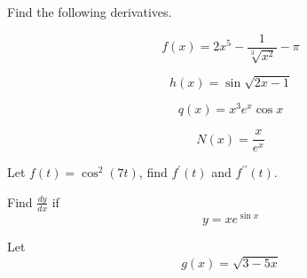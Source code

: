 \documentclass[11pt]{exam}
\begin{document}
\begin{questions}


\addpoints
\question[24] 
Find the following derivatives.  %

\begin{minipage}{.5\linewidth}
\begin{equation*}
 f(x)=2x^{5}-\frac{1}{\sqrt[3]{x^{2}}}-\pi
\end{equation*}
\end{minipage}%
\begin{minipage}{.5\linewidth}
\begin{equation*}
h(x)=\sin{\sqrt{2x-1}}
\end{equation*}
\end{minipage}



\vfill

\begin{minipage}{.5\linewidth}
\begin{equation*}
q(x)=x^{3}e^{x}\cos{x}
\end{equation*}
\end{minipage}%
\begin{minipage}{.5\linewidth}
\begin{equation*}
N(x)=\frac{x}{e^{x}}
\end{equation*}
\end{minipage}
\vfill





\addpoints
\question[12] Let $f(t)=\cos^{2}{(7t)}$, find $f^{\prime}(t)$ and $ f^{\prime\prime}(t)$.  %
\vfill

\newpage
\addpoints
\question[14] 
Find $\frac{dy}{dx}$ if 
\[
y=xe^{\sin{x}}
\]
\vfill


\addpoints
\question[15] 
Let 
\[
g(x) = \sqrt{3-5x}
\]




\end{questions}
\end{document}
